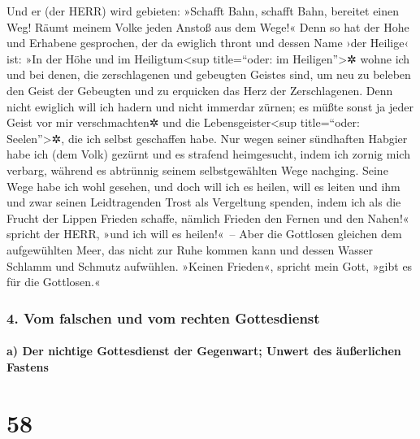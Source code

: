 Und er (der HERR) wird gebieten: »Schafft Bahn, schafft
Bahn, bereitet einen Weg! Räumt meinem Volke jeden Anstoß aus dem Wege!«
Denn so hat der Hohe und Erhabene gesprochen, der da
ewiglich thront und dessen Name ›der Heilige‹ ist: »In der Höhe und im
Heiligtum\textless sup title=``oder: im Heiligen''\textgreater✲ wohne
ich und bei denen, die zerschlagenen und gebeugten Geistes sind, um neu
zu beleben den Geist der Gebeugten und zu erquicken das Herz der
Zerschlagenen. Denn nicht ewiglich will ich hadern und
nicht immerdar zürnen; es müßte sonst ja jeder Geist vor mir
verschmachten✲ und die Lebensgeister\textless sup title=``oder:
Seelen''\textgreater✲, die ich selbst geschaffen habe.
Nur wegen seiner sündhaften Habgier habe ich (dem Volk)
gezürnt und es strafend heimgesucht, indem ich zornig mich verbarg,
während es abtrünnig seinem selbstgewählten Wege nachging.
Seine Wege habe ich wohl gesehen, und doch will ich es
heilen, will es leiten und ihm und zwar seinen Leidtragenden Trost als
Vergeltung spenden, indem ich als die Frucht der Lippen
Frieden schaffe, nämlich Frieden den Fernen und den Nahen!« spricht der
HERR, »und ich will es heilen!«~-- Aber die Gottlosen
gleichen dem aufgewühlten Meer, das nicht zur Ruhe kommen kann und
dessen Wasser Schlamm und Schmutz aufwühlen. »Keinen
Frieden«, spricht mein Gott, »gibt es für die Gottlosen.«

\hypertarget{vom-falschen-und-vom-rechten-gottesdienst}{%
\subsubsection{4. Vom falschen und vom rechten
Gottesdienst}\label{vom-falschen-und-vom-rechten-gottesdienst}}

\hypertarget{a-der-nichtige-gottesdienst-der-gegenwart-unwert-des-uxe4uuxdferlichen-fastens}{%
\paragraph{a) Der nichtige Gottesdienst der Gegenwart; Unwert des
äußerlichen
Fastens}\label{a-der-nichtige-gottesdienst-der-gegenwart-unwert-des-uxe4uuxdferlichen-fastens}}

\hypertarget{section-57}{%
\section{58}\label{section-57}}

